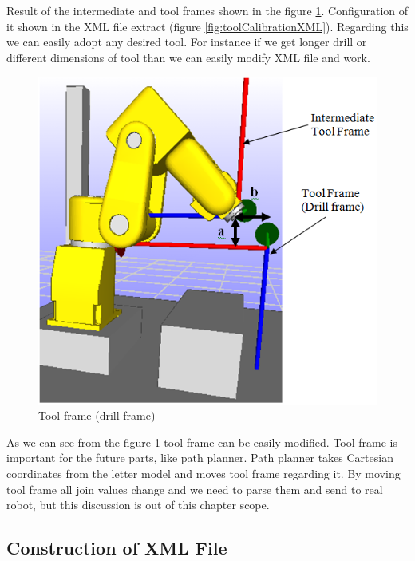Result of the intermediate and tool frames shown in the figure \ref{fig:toolFrame}. Configuration of it shown in the XML file extract (figure \ref{fig:toolCalibrationXML}). Regarding this we can easily adopt any desired tool. For instance if we get longer drill or different dimensions of tool than we can easily modify XML file and work.

\begin{figure}[H]
  \centering
  \includegraphics[scale= 0.6]{source/toolFrame.png}
  \caption{Tool frame (drill frame)}
  \label{fig:toolFrame}
\end{figure}

As we can see from the figure \ref{fig:toolFrame} tool frame can be easily modified. Tool frame is important for the future parts, like path planner. Path planner takes Cartesian coordinates from the letter model and moves tool frame regarding it. By moving tool frame all join values change and we need to parse them and send to real robot, but this discussion is out of this chapter scope.

\subsection{Construction of XML File}

